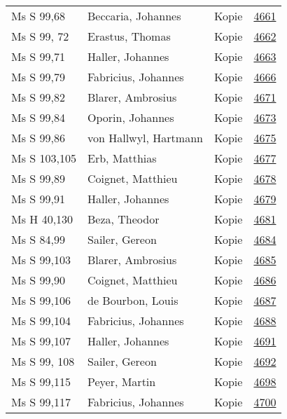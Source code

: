\documentclass[10pt,a4paper,landscape]{report}
\begin{document}
\begin{longtable}{p{16cm}p{4cm}lr}
Ms S 99,68	&	Beccaria, Johannes	&	Kopie	&	\href{http://130.60.24.72/assignment/4661}{4661}\\
Ms S 99, 72	&	Erastus, Thomas	&	Kopie	&	\href{http://130.60.24.72/assignment/4662}{4662}\\
Ms S 99,71	&	Haller, Johannes	&	Kopie	&	\href{http://130.60.24.72/assignment/4663}{4663}\\
Ms S 99,79	&	Fabricius, Johannes	&	Kopie	&	\href{http://130.60.24.72/assignment/4666}{4666}\\
Ms S 99,82	&	Blarer, Ambrosius	&	Kopie	&	\href{http://130.60.24.72/assignment/4671}{4671}\\
Ms S 99,84	&	Oporin, Johannes	&	Kopie	&	\href{http://130.60.24.72/assignment/4673}{4673}\\
Ms S 99,86	&	von Hallwyl, Hartmann	&	Kopie	&	\href{http://130.60.24.72/assignment/4675}{4675}\\
Ms S 103,105	&	Erb, Matthias	&	Kopie	&	\href{http://130.60.24.72/assignment/4677}{4677}\\
Ms S 99,89	&	Coignet, Matthieu	&	Kopie	&	\href{http://130.60.24.72/assignment/4678}{4678}\\
Ms S 99,91	&	Haller, Johannes	&	Kopie	&	\href{http://130.60.24.72/assignment/4679}{4679}\\
Ms H 40,130	&	Beza, Theodor	&	Kopie	&	\href{http://130.60.24.72/assignment/4681}{4681}\\
Ms S 84,99	&	Sailer, Gereon	&	Kopie	&	\href{http://130.60.24.72/assignment/4684}{4684}\\
Ms S 99,103	&	Blarer, Ambrosius	&	Kopie	&	\href{http://130.60.24.72/assignment/4685}{4685}\\
Ms S 99,90	&	Coignet, Matthieu	&	Kopie	&	\href{http://130.60.24.72/assignment/4686}{4686}\\
Ms S 99,106	&	de Bourbon, Louis	&	Kopie	&	\href{http://130.60.24.72/assignment/4687}{4687}\\
Ms S 99,104	&	Fabricius, Johannes	&	Kopie	&	\href{http://130.60.24.72/assignment/4688}{4688}\\
Ms S 99,107	&	Haller, Johannes	&	Kopie	&	\href{http://130.60.24.72/assignment/4691}{4691}\\
Ms S 99, 108	&	Sailer, Gereon	&	Kopie	&	\href{http://130.60.24.72/assignment/4692}{4692}\\
Ms S 99,115	&	Peyer, Martin	&	Kopie	&	\href{http://130.60.24.72/assignment/4698}{4698}\\
Ms S 99,117	&	Fabricius, Johannes	&	Kopie	&	\href{http://130.60.24.72/assignment/4700}{4700}\\

\end{longtable}
\end{document}
